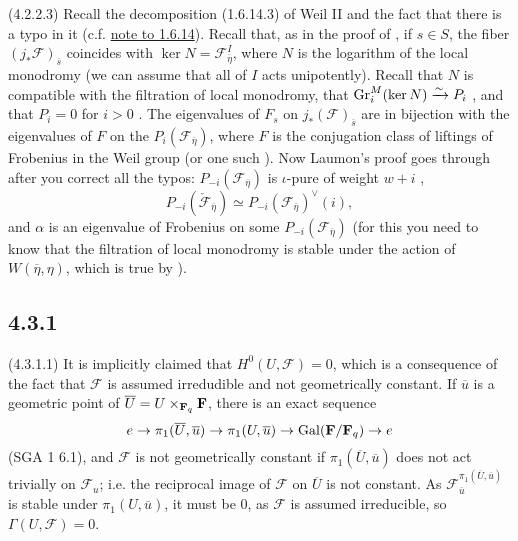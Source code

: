 \documentclass[deligne.tex]{subfiles}
\begin{document}
(4.2.2.3) Recall the decomposition (1.6.14.3) of Weil II and the fact that
there is a typo in it (c.f. \hyperref[weilii:1.6.14]{note to 1.6.14}).
Recall that, as in the proof of \cite[1.8.4]{weilii}, if $s\in S$, the fiber
$(j_*\mathscr F)_{\overline s}$ coincides with
$\ker N=\mathscr F^I_{\overline\eta}$, where $N$ is the logarithm of the
local monodromy (we can assume that all of $I$ acts unipotently).
Recall that $N$ is compatible with the filtration of local monodromy,
that $\operatorname{Gr}_i^M(\ker N)\xrightarrow\sim P_i$ \cite[1.6.6]{weilii}, and that
$P_i=0$ for $i>0$ \cite[1.6.4]{weilii}. The eigenvalues of $F_s$ on
$j_*(\mathscr F)_{\overline s}$ are in bijection with the eigenvalues of 
$F$ on the $P_i(\mathscr F_{\overline\eta})$, where $F$ is the
conjugation class of liftings of Frobenius in the Weil group
(or one such \cite[1.7.4]{weilii}). Now Laumon's proof goes through after
you correct all the typos: $P_{-i}(\mathscr F_{\overline\eta})$ is
$\iota$-pure of weight $w+i$ \cite[1.8.4]{weilii},
\begin{equation*}
	P_{-i}(\check{\mathscr F}_{\overline\eta})
	\simeq P_{-i}(\mathscr F_{\overline\eta})^\vee(i),
\end{equation*}
and $\alpha$ is an eigenvalue of Frobenius on some
$P_{-i}(\mathscr F_{\overline\eta})$ (for this you need to know that the filtration of local monodromy is stable under the action of $W(\overline\eta,\eta)$, which is true by \cite[1.7.5, 1.8.5]{weilii}).

\subsection*{4.3.1}
(4.3.1.1) It is implicitly claimed that
$H^0(U,\mathscr F)=0$, which is a consequence of the fact that $\mathscr F$
is assumed irredudible and not geometrically constant.
If $\overline u$ is a geometric point of $\overline U=U\times_{\mathbf{F}_q}\mathbf{F}$,
there is an exact sequence
\begin{equation*}
	e\rightarrow\pi_1(\overline U,\overline u)\rightarrow\pi_1(U,\overline u)\rightarrow\operatorname{Gal}(\mathbf{F}/\mathbf{F}_q)\rightarrow e
\end{equation*}
(SGA 1 6.1), and $\mathscr F$ is not geometrically constant if
$\pi_1(\overline U,\overline u)$ does not act trivially on $\mathscr F_{u}$;
i.e. the reciprocal image of $\mathscr F$ on $\overline U$ is not constant.
As $\mathscr F_{\overline u}^{\pi_1(\overline U,\overline u)}$ is stable
under $\pi_1(U,\overline u)$, it must be 0, as $\mathscr F$ is assumed
irreducible, so $\Gamma(U,\mathscr F)=0$.
\end{document}
